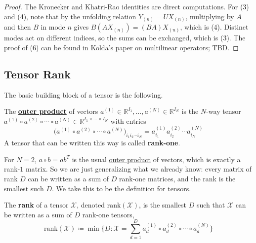   \begin{proof}
    The Kronecker and Khatri-Rao identities are direct computations. For (3) and (4), note that by the unfolding relation $Y_{(n)} = U X_{(n)}$, multiplying by $A$ and then $B$ in mode $n$ gives $B (A X_{(n)}) = (BA) X_{(n)}$, which is (4). Distinct modes act on different indices, so the sums can be exchanged, which is (3). The proof of (6) can be found in Kolda's paper on multilinear operators; TBD.
  \end{proof}

\subsection{Tensor Rank}

  The basic building block of a tensor is the following.

  \begin{definition}
    \label{def:outer-product}
    The \textbf{\hyperref[lin-def:outer-product]{outer product}} of vectors $a^{(1)} \in \mathbb{R}^{I_1}, \ldots, a^{(N)} \in \mathbb{R}^{I_N}$ is the $N$-way tensor $a^{(1)} \circ a^{(2)} \circ \cdots \circ a^{(N)} \in \mathbb{R}^{I_1 \times \cdots \times I_N}$ with entries
    \begin{equation}
      \big( a^{(1)} \circ a^{(2)} \circ \cdots \circ a^{(N)} \big)_{i_1 i_2 \cdots i_N} = a^{(1)}_{i_1} a^{(2)}_{i_2} \cdots a^{(N)}_{i_N}
    \end{equation}
    A tensor that can be written this way is called \textbf{rank-one}.
  \end{definition}

  For $N = 2$, $a \circ b = a b^T$ is the usual \hyperref[def:outer-product]{outer product} of vectors, which is exactly a rank-$1$ matrix. So we are just generalizing what we already know: every matrix of rank $D$ can be written as a sum of $D$ rank-one matrices, and the rank is the smallest such $D$. We take this to be the definition for tensors.

  \begin{definition}
    \label{def:tensor-rank}
    The \textbf{rank} of a tensor $\mathcal{X}$, denoted $\mathrm{rank}(\mathcal{X})$, is the smallest $D$ such that $\mathcal{X}$ can be written as a sum of $D$ rank-one tensors,
    \begin{equation}
      \mathrm{rank}(\mathcal{X}) \coloneqq \min \bigg\{ D : \mathcal{X} = \sum_{d=1}^D a^{(1)}_d \circ a^{(2)}_d \circ \cdots \circ a^{(N)}_d \bigg\}
    \end{equation}
  \end{definition}

